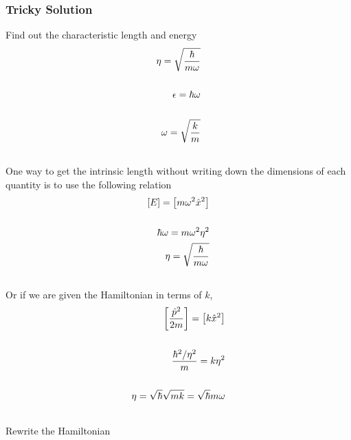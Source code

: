 \documentclass[letterpaper,10pt,english]{sphinxmanual}
\begin{document}
\subsubsection{Tricky Solution}
\label{QuantumMechanics:tricky-solution}
Find out the characteristic length and energy
\begin{gather}
\begin{split}\eta = \sqrt{\frac{\hbar }{m\omega }} \\\\
\epsilon = \hbar \omega \\\\
\omega = \sqrt{\frac{k}{m}}\end{split}\notag\\\begin{split}\end{split}\notag
\end{gather}
One way to get the intrinsic length without writing down the dimensions of each quantity is to use the following relation
\begin{gather}
\begin{split}\left[ E \right] = \left[ m \omega^2 \hat x^2 \right] \\\\
\hbar \omega = m \omega^2 \eta^2 \\\
\eta = \sqrt{ \frac{\hbar}{m\omega} }\end{split}\notag\\\begin{split}\end{split}\notag
\end{gather}
Or if we are given the Hamiltonian in terms of $k$,
\begin{gather}
\begin{split}\left[ \frac{\hat p^2}{2m} \right] = \left[ k \hat x^2 \right] \\\\
\frac{\hbar^2 / \eta^2 }{m} = k\eta^2 \\\\
\eta = \sqrt{\hbar}{ \sqrt{m k} } = \sqrt{ \hbar }{ m \omega }\end{split}\notag\\\begin{split}\end{split}\notag
\end{gather}
Rewrite the Hamiltonian
\end{document}
